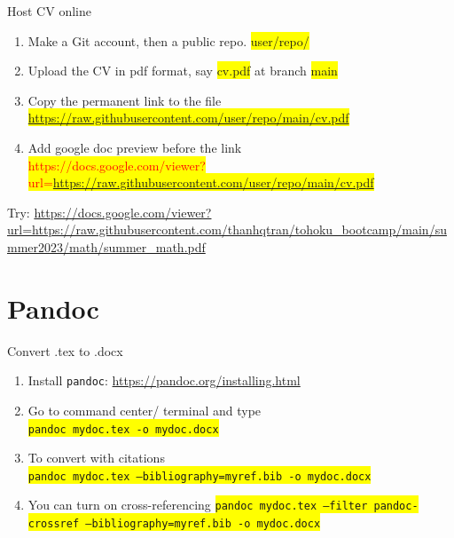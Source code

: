 \documentclass[
11pt, %
]{beamer}
\newcommand{\red}[1]{\textcolor{red}{#1}}
\begin{document}
	\begin{frame}{Host CV online}
		\begin{enumerate}
			\item Make a Git account, then a public repo. \colorbox{yellow}{user/repo/}
			\item Upload the CV in pdf format, say \colorbox{yellow}{cv.pdf} at branch \colorbox{yellow}{main}
			\item Copy the permanent link to the file \\
			 \colorbox{yellow}{\url{https://raw.githubusercontent.com/user/repo/main/cv.pdf}}
			\item Add google doc preview before the link \\
			\tiny \colorbox{yellow}{\red{https://docs.google.com/viewer?url=}\url{https://raw.githubusercontent.com/user/repo/main/cv.pdf}}
		\end{enumerate}
		Try: \url{https://docs.google.com/viewer?url=https://raw.githubusercontent.com/thanhqtran/tohoku_bootcamp/main/summer2023/math/summer_math.pdf}
	\end{frame}
	
	\section{Pandoc}
	\begin{frame}{Convert .tex to .docx}
		\begin{enumerate}
			\item Install \texttt{pandoc}: \url{https://pandoc.org/installing.html}
			\item Go to command center/ terminal and type \\
			\colorbox{yellow}{\texttt{pandoc mydoc.tex -o mydoc.docx}}
			\item To convert with citations \\
			\colorbox{yellow}{\texttt{pandoc mydoc.tex --bibliography=myref.bib -o mydoc.docx}}
			\item You can turn on cross-referencing
			\colorbox{yellow}{\texttt{pandoc mydoc.tex --filter pandoc-crossref --bibliography=myref.bib -o mydoc.docx}}
		\end{enumerate}
	\end{frame}
	

	
		
	
	
	
	
\end{document}
